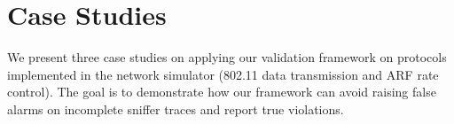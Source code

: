 \section{Case Studies}
\label{sec:case}

We present three case studies on applying our validation framework on protocols
implemented in the \ns{} network simulator (802.11 data transmission
and ARF rate control). The goal is to demonstrate how our framework can avoid
raising false alarms on incomplete sniffer traces and report true violations.



